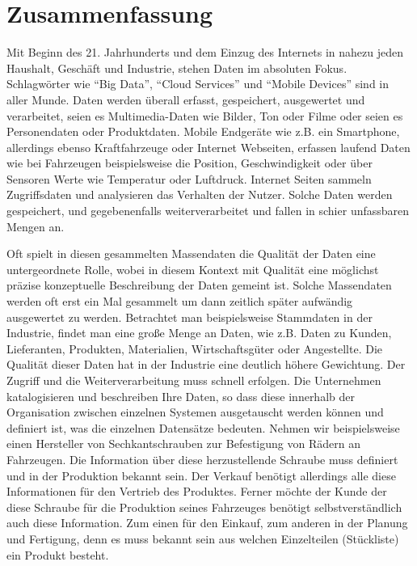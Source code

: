 \chapter*{Zusammenfassung}


Mit Beginn des 21. Jahrhunderts und dem Einzug des Internets in nahezu jeden Haushalt, Geschäft und Industrie, stehen Daten im absoluten Fokus. Schlagwörter wie \enquote{Big Data}, \enquote{Cloud Services} und \enquote{Mobile Devices} sind in aller Munde. Daten werden überall erfasst, gespeichert, ausgewertet und verarbeitet, seien es Multimedia-Daten wie Bilder, Ton oder Filme oder seien es Personendaten oder Produktdaten. Mobile Endgeräte wie z.B. ein Smartphone, allerdings ebenso Kraftfahrzeuge oder Internet Webseiten, erfassen laufend Daten wie bei Fahrzeugen beispielsweise die Position, Geschwindigkeit oder über Sensoren Werte wie Temperatur oder Luftdruck. Internet Seiten sammeln Zugriffsdaten und analysieren das Verhalten der Nutzer. Solche Daten werden gespeichert, und gegebenenfalls weiterverarbeitet und fallen in schier unfassbaren Mengen an. 

Oft spielt in diesen gesammelten Massendaten die Qualität der Daten eine untergeordnete Rolle, wobei in diesem Kontext mit Qualität eine möglichst präzise konzeptuelle Beschreibung der Daten gemeint ist. Solche Massendaten werden oft erst ein Mal gesammelt um dann zeitlich später aufwändig ausgewertet zu werden.
Betrachtet man beispielsweise Stammdaten in der Industrie, findet man eine große Menge an Daten, wie z.B. Daten zu Kunden, Lieferanten, Produkten, Materialien, Wirtschaftsgüter oder Angestellte. Die Qualität dieser Daten hat in der Industrie eine deutlich höhere Gewichtung. Der Zugriff und die Weiterverarbeitung muss schnell erfolgen. Die Unternehmen katalogisieren und beschreiben Ihre Daten, so dass diese innerhalb der Organisation zwischen einzelnen Systemen ausgetauscht werden können und definiert ist, was die einzelnen Datensätze bedeuten. Nehmen wir beispielsweise einen Hersteller von Sechkantschrauben zur Befestigung von Rädern an Fahrzeugen. Die Information über diese herzustellende Schraube muss definiert und in der Produktion bekannt sein. Der Verkauf benötigt allerdings alle diese Informationen für den Vertrieb des Produktes. Ferner möchte der Kunde der diese Schraube für die Produktion seines Fahrzeuges benötigt selbstverständlich auch diese Information. Zum einen für den Einkauf, zum anderen in der Planung und Fertigung, denn es muss bekannt sein aus welchen Einzelteilen (Stückliste) ein Produkt besteht. 

